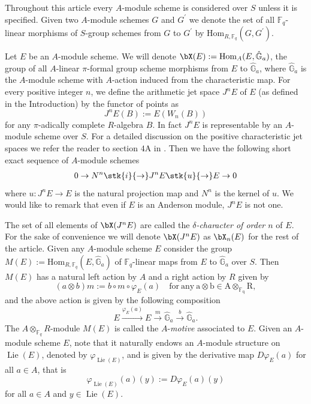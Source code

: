 \documentclass{amsart}
\def \d{\delta}
\numberwithin {equation}{section}
\newcommand{\map}{\rightarrow}
\def \vp{\varphi}
\def \d{\delta} \def \bZ{{\mathbb Z}} \def \bV{{\mathcal V}} \def \bF{{\bf F}}
\DeclareMathOperator{\Lie}{\mathrm{Lie}}
\begin{document}
 Throughout this article every $A$-module scheme is considered over $S$ unless it is specified.
Given two  $A$-module schemes $G$ and $G^{'}$  we denote the set of all $\mathbb{F}_{q}$-linear morphisms of $S$-group schemes from $G$ to $G^{'}$ by $\mathrm{Hom}_{R,\mathbb{F}_{q}}(G,G^{'})$. \medskip

Let $E$ be an $A$-module scheme. We will denote ${\bX}(E):=\mathrm{Hom}_{A}(E,\hat{\mathbb{G}}_{a})$, the group of all $A$-linear $\pi$-formal group scheme 
morphisms from $E$ to $\hat{\mathbb{G}}_{a}$, where $\hat{\mathbb{G}}_{a}$ is the $A$-module scheme with $A$-action induced from the characteristic map.
For every positive integer $n$, we define the arithmetic jet space $J^{n}E$ of 
$E$ (as defined in the Introduction) by the functor of points as 
$$J^{n}E(B):=E(W_{n}(B))$$
for any $\pi$-adically complete $R$-algebra $B$. In fact $J^{n}E$ is representable by an $A$-module scheme over $S$. \cblue For a detailed discussion on the positive characteristic jet spaces we refer the reader to section $4$A in \cite{BS b}.  \color{black} 
Then we have the following short exact sequence of $A$-module schemes
\begin{align}
\label{fshort1}
0 \map N^n \stk{i}{\map} J^nE \stk{u}{\map} E \map 0 
\end{align}
where $u:J^nE \map E$ is the natural projection map and $N^n$ is the 
kernel of $u$. We would like to remark that even if $E$ is an Anderson module,
$J^nE$ is not one.

The set of all elements of ${\bX}(J^{n}E)$ are called the \emph{$\d$-character of order $n$} of $E$. For the sake of convenience we will 
denote ${\bX}(J^{n}E)$ as ${\bX}_{n}(E)$ for the rest of the article. Given any $A$-module scheme $E$ consider the group $M(E):=\mathrm{Hom}_{R,\mathbb{F}_{q}}(E, \hat{\mathbb{G}}_{a})$ of $\mathbb{F}_{q}$-linear maps from $E$ to $\hat{\mathbb{G}}_{a}$ over $S$. Then $M(E)$ has a natural left action by $A$ and a right action by $R$ given by  
$$(a\otimes b)m:=b\circ m\circ \varphi_{E}(a)\quad \mathrm{for \ any \ a\otimes b \in A\otimes_{\mathbb{F}_{q}}R},$$
and the above action is given by the following composition
$$ E \xrightarrow{\varphi_{E}(a)}E\xrightarrow{m} \hat{\mathbb{G}}_{a}\xrightarrow{b}\hat{\mathbb{G}}_{a}.$$ The $A\otimes_{\mathbb{F}_{q}}R$-module $M(E)$ is called the  $A$-\emph{motive} associated to $E$.  
\cblue
Given an $A$-module scheme $E$, note that it naturally endows an $A$-module
structure on $\Lie (E)$, denoted by $\vp_{\Lie (E)}$, and is given by the 
derivative map $D\vp_E(a)$ for all $a \in A$, that is 
$$
\vp_{\Lie (E)}(a)(y) := D\vp_E(a)(y)
$$
for all $a \in A$ and $y \in \Lie (E)$.
\end{document}
